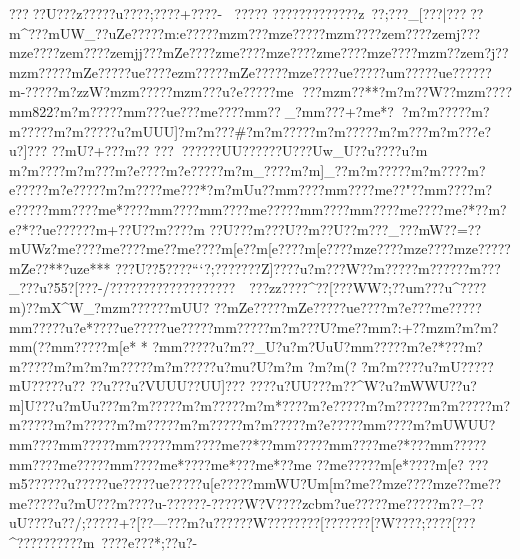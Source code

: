{{{{{{{{{{{{{{{{{{{{{{{{{{{{{{{{{{{{{{{{{{{{{{{{{{{{{{{{{{{{{{{{{{{{{{{{{{{{{{{{{{{{{{{{{{{{{{{{{{{{{{{{{{{{{{{{{{{{{{{{{{{{{{{{{{{{{{{{{{{{{{{{{{{{{{{{{{{{{{{{{{{{{{{{{{{{{{{{{{{{{{{{{{{{{{{{{{{{{{{{{{{{{{{{{{{{{{{{{{{{{{{{{{{{{{{{{{{{{{{{{{{{{{{{{{{{{{{{{{{{{{{{{{{{{{{{{{{{{{{{{{{{{{{{{{{{{{{{{{{{{{{{{{{{{{{{{{{{{{{{{{{{{{{{{{{{{{{{{{{{{{{{{{{{{{{{{{{{{{{{{{{{{{{{{{{{{{{{{{{{{{{{{{{{{{{{{{{{{{{{{{{{{{{{{{{{{{{{{{{{{{{{{{{{{{{{{{{{{{{{{{{{{{{{{{{{{{{{{{{{{{{{{{{{{{{{{{{{{{{{{{{{{{{{{{{{{{{{{{{{{{{{{{{{{{{{{{{{{{{{{{{{{{{{{{{{{{{{{{{{{{{{{{{{{{{{{{{{{{{{{{{{{{{{???}??U???}z?????u????;??}??+????-
?????
?????????????z~??;? ??_[???|?????m^??}?mUW_??uZe?????m:e?????mzm???{mze?????mzm????ze{m????ze{mj???{mze????ze{m????ze{mjj???mZe????zm{e????{mze????zm{e????{mze????{mzm??ze{m?j??{mzm?????mZe?????u{e????{ezm?????mZe?????mze????u{e?????u{m?????u{e?????}?m-????}?m?zzW?mzm?????mzm???u?e?????m{e ???mzm??**?m?m??W??mzm ????m{m822?{m?m?????m{m???u{e???m{e??? ?m{m??_?m{m???+?m{e*??m?m?????m?m?????m?m?????u?mUUU]?m?m???#?m?m?????m?m?????m?m???m?m???e?u?]???
?}?mU?+??}?m??
?}?}?????}??UU???}???U???}Uw_U?}?u????u?m\\^^?m?m????m?m??  ?m?e??? ?m?e?????m?m_????m?m]_??m?m?????m?m????m?e?????m?e?????m?m????m{e???*?m?mUu??m{m??? ?m{m????{m{e??"??m{m????{m?e?????m{m????{m{e*????m{m????{m{m????{m{e?????m{m????m{m????{m{e????{m{e?*??{m?e?*? ?u{e?????}?m+??U?}?m ????m
??U???m???U?}?m ??U?}?m???_???mW??=??{mUWz?{m{e????{m{e????{m{e??{m{e????{m[e??{m[e????{m[e????{mze????{mze????{mze?????mZe??**?uze***
???}U??5????```?;???????Z]????u?m???W?}?m????}?m?????}?m???_???u?55?[???-/???{????????????????~~??{?zz??{??^??[???WW?;??um???u^???}?m)  ?}?mX^W_?mzm?????}?mUU?%
??mZe?????mZe?????u{e????{m?e???m{e?????m{m?????u?e*????u{e?????u{e?????m{m?????m?m???U?m{e   ??m{m?:+??mzm  ?m?m   ?m{m(??m{m?????m[e*
*
?m{m?????u?m??_U?u?m?UuU?m{m?????m?e?*???m?m?????m?m    ?m?m?????m?m?????u?mu?U?m?m   ?m?m(?  ?m?m??? ?u?mU?????mU????}?u??
 ?}?u??  ?u?}VUUU?}?}UU]??}?}
  ?}?}?  ?u?}UU??}?m??^W?u?mWWU??u?m]U???u?mUu???m?m?????m?m?????m?m*????m?e?????m?m?????m?m?????m?m?????m?m?????m?m?????m?m?????m?m?????m?e?????m{m????m?mUWUU?m{m????m{m?????m{m?????m{m????{m{e??*??m{m?????m{m????{m{e?*???m{m?????m{m????{m{e?????m{m????m{e*????m{e*???m{e  *??m{e   ??m{e?????m[e*????m[e? 
??}?m5??????u?????u{e?????u{e?????u[e?????m{mWU?U{m[m?   {m{e??{mze????{mze??{m{e??m{e?????u?mU???}{m???}?u  -??????-?????W?V????zcbm?u{e?????m{e????}?m??--?}?uU????u??/;?????+?[??---???}m?u??????W????????[???????[?W???{?;??? ?[???^?????}????}?m~????}{e???*;??u?-
}}}}}}}}}}}}}}}}}}}}}}}}}}}}}}}}}}}}}}}}}}}}}}}}}}}}}}}}}}}}}}}}}}}}}}}}}}}}}}}}}}}}}}}}}}}}}}}}}}}}}}}}}}}}}}}}}}}}}}}}}}}}}}}}}}}}}}}}}}}}}}}}}}}}}}}}}}}}}}}}}}}}}}}}}}}}}}}}}}}}}}}}}}}}}}}}}}}}}}}}}}}}}}}}}}}}}}}}}}}}}}}}}}}}}}}}}}}}}}}}}}}}}}}}}}}}}}}}}}}}}}}}}}}}}}}}}}}}}}}}}}}}}}}}}}}}}}}}}}}}}}}}}}}}}}}}}}}}}}}}}}}}}}}}}}}}}}}}}}}}}}}}}}}}}}}}}}}}}}}}}}}}}}}}}}}}}}}}}}}}}}}}}}}}}}}}}}}}}}}}}}}}}}}}}}}}}}}}}}}}}}}}}}}}}}}}}}}}}}}}}}}}}}}}}}}}}}}}}}}}}}}}}}}}}}}}}}}}}}}}}}}}}}}}}}}}}}}}}}}}}}}}}}}}}}}}}}}}}}}}}}}}}}}}}}}}}}}}}}}}}}}}}}}}}}}}}}}}}}}}}}}}}}}}}}}}}}}}}}}}}}}}}}}}}}}}}}}}}}}}}}}}}}}}}}}}}}}}}}}}}}}}}}}}}}}}}}}}}}}}}
